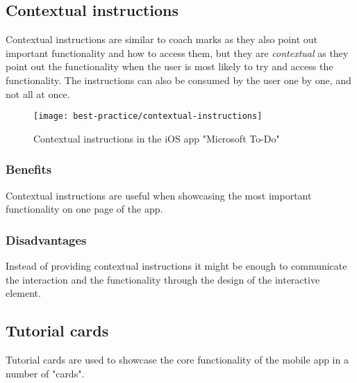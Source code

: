 \subsection{Contextual instructions}

Contextual instructions are similar to coach marks as they also point out important functionality and how to access them, but they are \textit{contextual} as they point out the functionality when the user is most likely to try and access the functionality. The instructions can also be consumed by the user one by one, and not all at once.

\begin{figure}[ht]
  \centering
    \texttt{[image: best-practice/contextual-instructions]}
  \caption{Contextual instructions in the iOS app "Microsoft To-Do"}
  \label{fig:best-practice/contextual-instructions}
\end{figure}

\subsubsection{Benefits}
Contextual instructions are useful when showcasing the most important functionality on one page of the app.

\subsubsection{Disadvantages}
Instead of providing contextual instructions it might be enough to communicate the interaction and the functionality through the design of the interactive element.

\subsection{Tutorial cards}

Tutorial cards are used to showcase the core functionality of the mobile app in a number of "cards".

